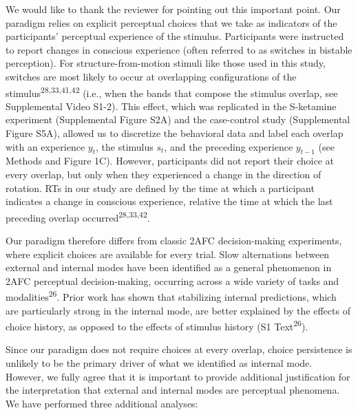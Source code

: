 \documentclass[
]{article}
\begin{document}
We would like to thank the reviewer for pointing out this important
point. Our paradigm relies on explicit perceptual choices that we take
as indicators of the participants' perceptual experience of the
stimulus. Participants were instructed to report changes in conscious
experience (often referred to as switches in bistable perception). For
structure-from-motion stimuli like those used in this study, switches
are most likely to occur at overlapping configurations of the
stimulus\textsuperscript{28,33,41,42} (i.e., when the bands that compose
the stimulus overlap, see Supplemental Video S1-2). This effect, which
was replicated in the S-ketamine experiment (Supplemental Figure S2A)
and the case-control study (Supplemental Figure S5A), allowed us to
discretize the behavioral data and label each overlap with an experience
\(y_t\), the stimulus \(s_t\), and the preceding experience \(y_{t-1}\)
(see Methods and Figure 1C). However, participants did not report their
choice at every overlap, but only when they experienced a change in the
direction of rotation. RTs in our study are defined by the time at which
a participant indicates a change in conscious experience, relative the
time at which the last preceding overlap
occurred\textsuperscript{28,33,42}.

Our paradigm therefore differs from classic 2AFC decision-making
experiments, where explicit choices are available for every trial. Slow
alternations between external and internal modes have been identified as
a general phenomenon in 2AFC perceptual decision-making, occurring
across a wide variety of tasks and modalities\textsuperscript{26}. Prior
work has shown that stabilizing internal predictions, which are
particularly strong in the internal mode, are better explained by the
effects of choice history, as opposed to the effects of stimulus history
(S1 Text\textsuperscript{26}).

Since our paradigm does not require choices at every overlap, choice
persistence is unlikely to be the primary driver of what we identified
as internal mode. However, we fully agree that it is important to
provide additional justification for the interpretation that external
and internal modes are perceptual phenomena. We have performed three
additional analyses:
\end{document}

